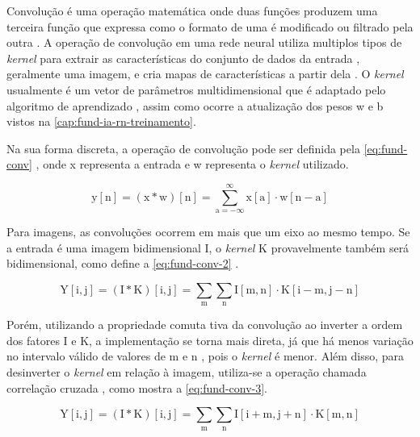 
Convolução é uma operação matemática onde duas funções produzem uma terceira função que expressa como o formato de uma é modificado ou filtrado pela outra \cite{ref:Yan}. A operação de convolução em uma rede neural utiliza multiplos tipos de \textit{kernel} para extrair as características do conjunto de dados da entrada \cite{ref:Eden-Ierapetritou-Towler}, geralmente uma imagem, e cria mapas de características a partir dela \cite{ref:Gholamalinezhad-Khosravi}. O \textit{kernel} usualmente é um vetor de parâmetros multidimensional que é adaptado pelo algoritmo de aprendizado \cite{ref:Goodfellow-Bengio-Courville}, assim como ocorre a atualização dos pesos w e b vistos na \autoref{cap:fund-ia-rn-treinamento}.

Na sua forma discreta, a operação de convolução pode ser definida pela \autoref{eq:fund-conv} \cite{ref:Goodfellow-Bengio-Courville}, onde x representa a entrada e w representa o \textit{kernel} utilizado.

\begin{equation} \label{eq:fund-conv}
\mathrm{
  y[n] = (x \ast w)[n] = \sum_{a = -\infty}^{\infty} x[a] \cdot w [n - a]
}
\end{equation}

Para imagens, as convoluções ocorrem em mais que um eixo ao mesmo tempo. Se a entrada é uma imagem bidimensional I, o \textit{kernel} K provavelmente também será bidimensional, como define a \autoref{eq:fund-conv-2} \cite{ref:Goodfellow-Bengio-Courville}.

\begin{equation} \label{eq:fund-conv-2}
\mathrm{
  Y[i, j] = (I \ast K)[i, j] = \sum_{m} \sum_{n} I[m,n] \cdot K [i-m, j-n]
}
\end{equation}

Porém, utilizando a propriedade comuta  tiva da convolução ao inverter a ordem dos fatores I e K, a implementação se torna mais direta, já que há menos variação no intervalo válido de valores de m e n \cite{ref:Goodfellow-Bengio-Courville}, pois o \textit{kernel} é menor. Além disso, para desinverter o \textit{kernel} em relação à imagem, utiliza-se a operação chamada correlação cruzada \cite{ref:Goodfellow-Bengio-Courville}, como mostra a \autoref{eq:fund-conv-3}.

\begin{equation} \label{eq:fund-conv-3}
\mathrm{
 Y[i, j] = (I \ast K)[i, j] = \sum_{m} \sum_{n} I[i + m,j + n] \cdot K [m,n]
}
\end{equation}

